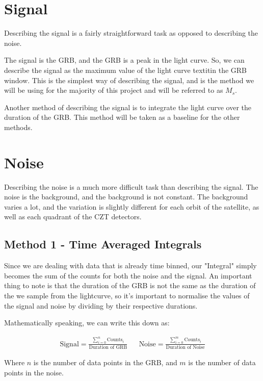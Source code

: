 \documentclass[11pt]{book} %
\begin{document}
\newpage

\section{Signal}

Describing the signal is a fairly straightforward task as opposed to describing the noise.

The signal is the GRB, and the GRB is a peak in the light curve. So, we can describe the signal as the maximum value of the light curve textit{in the GRB window}. This is the simplest way of describing the signal, and is the method we will be using for the majority of this project and will be referred to as \textbf{$M_s$}.

Another method of describing the signal is to integrate the light curve over the duration of the GRB. This method will be taken as a baseline for the other methods.

\section{Noise}

Describing the noise is a much more difficult task than describing the signal. The noise is the background, and the background is not constant. The background varies a lot, and the variation is slightly different for each orbit of the satellite, as well as each quadrant of the CZT detectors.

\subsection{Method 1 - Time Averaged Integrals}
Since we are dealing with data that is already time binned, our "Integral" simply becomes the sum of the counts for both the noise and the signal. An important thing to note is that the duration of the GRB is not the same as the duration of the we sample from the lightcurve, so it's important to normalise the values of the signal and noise by dividing by their respective durations.

Mathematically speaking, we can write this down as: 

\begin{align*}
    \text{Signal} = \frac{\sum_{i=0}^{n} \text{Counts}_i}{\text{Duration of GRB}} 
    &&
    \text{Noise} = \frac{\sum_{i=0}^{m} \text{Counts}_i}{\text{Duration of Noise}}
\end{align*}
    
Where $n$ is the number of data points in the GRB, and $m$ is the number of data points in the noise.
\end{document}
